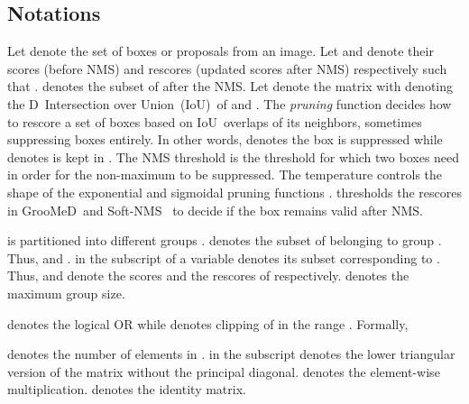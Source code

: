 \documentclass[final]{cvpr}
\newcommand{\methodNameShort}{GrooMeD}
\newcommand{\iou}{IoU}
\newcommand{\twoD}{D}
\newcommand{\iouTwoD}{\iou}
\newcommand{\softNmsCaps}{Soft-NMS}
\begin{document}
\subsection{Notations}\label{subsec:notations}
        Let  denote the set of boxes or proposals  from an image.
        Let  and  denote their scores (before NMS) and rescores (updated scores after NMS) respectively such that .  denotes the subset of  after the NMS. 
        Let   denote the  matrix with  denoting the \twoD~Intersection over Union~(\iouTwoD)~of  and . 
        The \emph{pruning} function  decides how to rescore a set of boxes  based on \iouTwoD~overlaps of its neighbors, sometimes suppressing boxes entirely.
        In other words,  denotes the box  is suppressed while  denotes  is kept in . 
        The NMS threshold  is the threshold for which two boxes need in order for the non-maximum to be suppressed. 
        The temperature  controls the shape of the exponential and sigmoidal pruning functions . 
         thresholds the rescores in \methodNameShort~and \softNmsCaps~\cite{bodla2017code} to decide if the box remains valid after NMS.
        
         is partitioned into different groups . 
         denotes the subset of  belonging to group . 
        Thus,  and . 
         in the subscript of a variable denotes its subset corresponding to . 
        Thus,  and  denote the scores and the rescores of  respectively. 
         denotes the maximum group size.
        
         denotes the logical OR while  denotes clipping of  in the range . Formally,
        \vspace{-0.2cm}
        
         denotes the number of elements in . 
         in the subscript denotes the lower triangular version of the matrix without the principal diagonal.
         denotes the element-wise multiplication.
         denotes the identity matrix.
\end{document}
